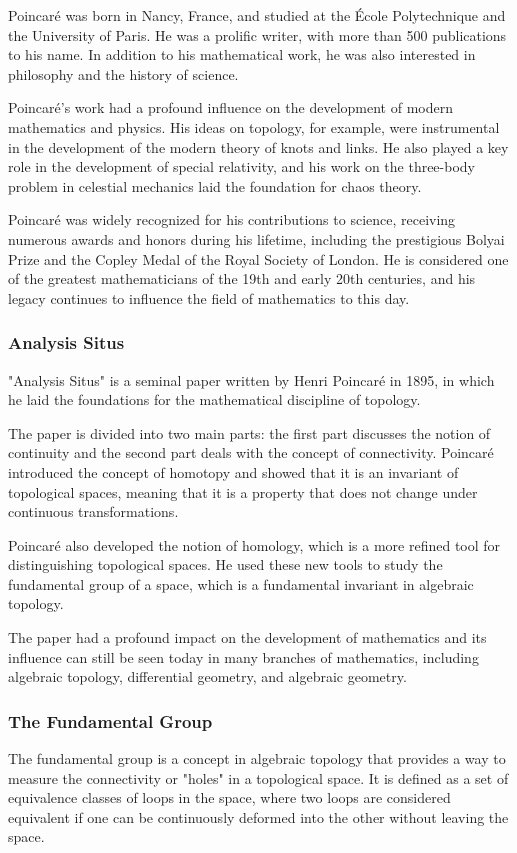 \documentclass{IEEEcsmag}
\begin{document}
    Poincaré was born in Nancy, France, and studied at the École Polytechnique and the University of Paris. He 
    was a prolific writer, with more than 500 publications to his name. In addition to his mathematical work, he 
    was also interested in philosophy and the history of science.

    Poincaré's work had a profound influence on the development of modern mathematics and physics. His ideas on 
    topology, for example, were instrumental in the development of the modern theory of knots and links. He also 
    played a key role in the development of special relativity, and his work on the three-body problem in 
    celestial mechanics laid the foundation for chaos theory.

    Poincaré was widely recognized for his contributions to science, receiving numerous awards and honors during 
    his lifetime, including the prestigious Bolyai Prize and the Copley Medal of the Royal Society of London. He 
    is considered one of the greatest mathematicians of the 19th and early 20th centuries, and his legacy 
    continues to influence the field of mathematics to this day.

    \subsubsection{Analysis Situs}
      "Analysis Situs" is a seminal paper written by Henri Poincaré in 1895, in which he laid the foundations for 
      the mathematical discipline of topology.

      The paper is divided into two main parts: the first part discusses the notion of continuity and the second 
      part deals with the concept of connectivity. Poincaré introduced the concept of homotopy and showed that it 
      is an invariant of topological spaces, meaning that it is a property that does not change under continuous 
      transformations.

      Poincaré also developed the notion of homology, which is a more refined tool for distinguishing topological 
      spaces. He used these new tools to study the fundamental group of a space, which is a fundamental invariant 
      in algebraic topology.

      The paper had a profound impact on the development of mathematics and its influence can still be seen today 
      in many branches of mathematics, including algebraic topology, differential geometry, and algebraic 
      geometry.

      \subsubsection{The Fundamental Group}
        The fundamental group is a concept in algebraic topology that provides a way to measure the connectivity 
        or "holes" in a topological space. It is defined as a set of equivalence classes of loops in the space, 
        where two loops are considered equivalent if one can be continuously deformed into the other without 
        leaving the space.
\end{document}
